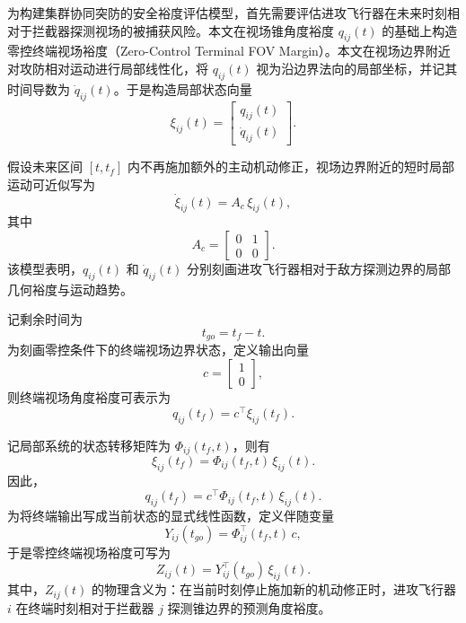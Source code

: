 为构建集群协同突防的安全裕度评估模型，首先需要评估进攻飞行器在未来时刻相对于拦截器探测视场的被捕获风险。本文在视场锥角度裕度 $q_{ij}(t)$ 的基础上构造零控终端视场裕度（Zero-Control Terminal FOV Margin）。本文在视场边界附近对攻防相对运动进行局部线性化，将 $q_{ij}(t)$ 视为沿边界法向的局部坐标，并记其时间导数为 $\dot q_{ij}(t)$。于是构造局部状态向量
\begin{equation}
\xi_{ij}(t)=
\begin{bmatrix}
q_{ij}(t)\\
\dot q_{ij}(t)
\end{bmatrix}.
\end{equation}

假设未来区间 $[t,t_f]$ 内不再施加额外的主动机动修正，视场边界附近的短时局部运动可近似写为
\begin{equation}
\dot \xi_{ij}(t)
=
A_{c}\,\xi_{ij}(t),
\end{equation}
其中
\begin{equation}
A_{c}
=
\begin{bmatrix}
0 & 1\\
0 & 0
\end{bmatrix}.
\end{equation}
该模型表明，$q_{ij}(t)$ 和 $\dot q_{ij}(t)$ 分别刻画进攻飞行器相对于敌方探测边界的局部几何裕度与运动趋势。

记剩余时间为
\begin{equation}
t_{go}=t_f-t.
\end{equation}
为刻画零控条件下的终端视场边界状态，定义输出向量
\begin{equation}
c=
\begin{bmatrix}
1\\
0
\end{bmatrix},
\end{equation}
则终端视场角度裕度可表示为
\begin{equation}
q_{ij}(t_f)=c^{\top}\xi_{ij}(t_f).
\end{equation}

记局部系统的状态转移矩阵为 $\Phi_{ij}(t_f,t)$，则有
\begin{equation}
\xi_{ij}(t_f)=\Phi_{ij}(t_f,t)\,\xi_{ij}(t).
\end{equation}
因此，
\begin{equation}
q_{ij}(t_f)=c^{\top}\Phi_{ij}(t_f,t)\,\xi_{ij}(t).
\end{equation}
为将终端输出写成当前状态的显式线性函数，定义伴随变量
\begin{equation}
Y_{ij}(t_{go})=\Phi_{ij}^{\top}(t_f,t)\,c,
\end{equation}
于是零控终端视场裕度可写为
\begin{equation}
Z_{ij}(t)=Y_{ij}^{\top}(t_{go})\,\xi_{ij}(t).
\end{equation}
其中，$Z_{ij}(t)$ 的物理含义为：在当前时刻停止施加新的机动修正时，进攻飞行器 $i$ 在终端时刻相对于拦截器 $j$ 探测锥边界的预测角度裕度。

